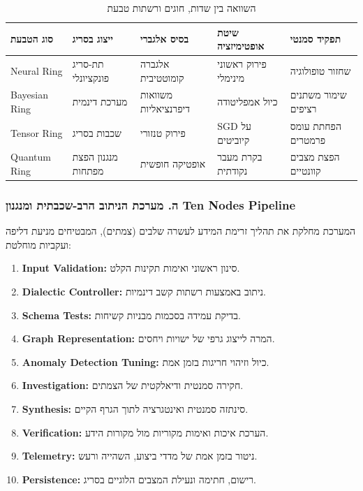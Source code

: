 \documentclass{article}
\begin{document}
\begin{table}[h]
\centering
\caption{השוואה בין שדות, חוגים ורשתות טבעת}
\begin{tabular}{lllll}
\toprule
\textbf{סוג הטבעת} & \textbf{ייצוג בסריג} & \textbf{בסיס אלגברי} & \textbf{שיטת אופטימיזציה} & \textbf{תפקיד סמנטי} \\
\midrule
Neural Ring & תת-סריג פונקציונלי & אלגברה קומוטטיבית & פירוק ראשוני מינימלי & שחזור טופולוגיה \\
Bayesian Ring & מערכת דינמית & משוואות דיפרנציאליות & כיול אמפליטודה & שימור משתנים רציפים \\
Tensor Ring & שכבות בסריג & פירוק טנזורי & SGD על קיוביטים & הפחתת עומס פרמטרים \\
Quantum Ring & מנגנון הפצת מפתחות & אופטיקה חופשית & בקרת מעבר נקודתית & הפצת מצבים קוונטיים \\
\bottomrule
\end{tabular}
\end{table}

\subsubsection{ה. מערכת הניתוב הרב-שכבתית ומנגנון Ten Nodes Pipeline}
המערכת מחלקת את תהליך זרימת המידע לעשרה שלבים (צמתים), המבטיחים מניעת דליפה ועקביות מוחלטת:
\begin{enumerate}
    \item \textbf{Input Validation:} סינון ראשוני ואימות תקינות הקלט.
    \item \textbf{Dialectic Controller:} ניתוב באמצעות רשתות קשב דינמיות.
    \item \textbf{Schema Tests:} בדיקת עמידה בסכמות מבניות קשיחות.
    \item \textbf{Graph Representation:} המרה לייצוג גרפי של ישויות ויחסים.
    \item \textbf{Anomaly Detection Tuning:} כיול וזיהוי חריגות בזמן אמת.
    \item \textbf{Investigation:} חקירה סמנטית ודיאלקטית של הצמתים.
    \item \textbf{Synthesis:} סינתזה סמנטית ואינטגרציה לתוך הגרף הקיים.
    \item \textbf{Verification:} הערכת איכות ואימות מקוריות מול מקורות הידע.
    \item \textbf{Telemetry:} ניטור בזמן אמת של מדדי ביצוע, השהייה ורעש.
    \item \textbf{Persistence:} רישום, חתימה ונעילת המצבים הלוגיים בסריג.
\end{enumerate}
\end{document}
